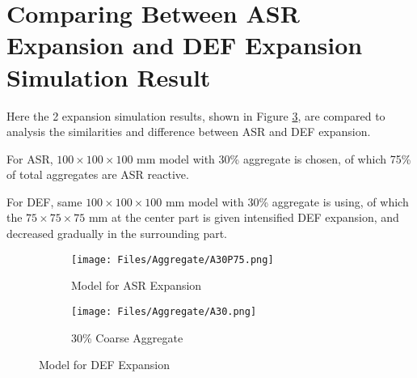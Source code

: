 \clearpage
\section{Comparing Between ASR Expansion and DEF Expansion Simulation Result}


Here the 2 expansion simulation results, shown in Figure \ref{fig:Aggreddddate_Percentage}, are compared to analysis the similarities and difference between ASR and DEF expansion.

For ASR, $100 \times 100 \times 100$ mm model with 30\%  aggregate is chosen, of which 75\% of total aggregates are ASR reactive.

For DEF, same $100 \times 100 \times 100$ mm model with 30\%  aggregate is using, of which the $75 \times 75 \times 75$ mm at the center part is given intensified DEF expansion, and decreased gradually in the surrounding part.

\begin{figure}[!h]
\centering
\begin{subfigure}{.5\textwidth}
  \centering
  \texttt{[image: Files/Aggregate/A30P75.png]}
  \caption{Model for ASR Expansion}
  \label{fig:A15_model}
\end{subfigure}%
\begin{subfigure}{.5\textwidth}
  \centering
  \texttt{[image: Files/Aggregate/A30.png]}
  \caption{30\% Coarse Aggregate}
  \label{fig:A15_model}
\end{subfigure}
\caption{Model for DEF Expansion}
\label{fig:Aggreddddate_Percentage}
\end{figure}

\clearpage

